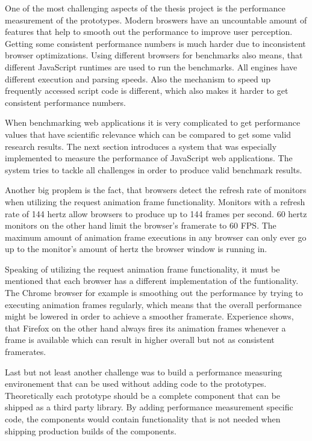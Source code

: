 One of the most challenging aspects of the thesis project is the performance measurement of the prototypes. Modern broswers have an uncountable amount of features that help to smooth out the performance to improve user perception. Getting some consistent performance numbers is much harder due to inconsistent browser optimizations. Using different browsers for benchmarks also means, that different JavaScript runtimes are used to run the benchmarks. All engines have different execution and parsing speeds. Also the mechanism to speed up frequently accessed script code is different, which also makes it harder to get consistent performance numbers.

When benchmarking web applications it is very complicated to get performance values that have scientific relevance which can be compared to get some valid research results. The next section introduces a system that was especially implemented to measure the performance of JavaScript web applications. The system tries to tackle all challenges in order to produce valid benchmark results.

Another big proplem is the fact, that browsers detect the refresh rate of monitors when utilizing the request animation frame functionality. Monitors with a refresh rate of 144 hertz allow browsers to produce up to 144 frames per second. 60 hertz monitors on the other hand limit the browser's framerate to 60 FPS. The maximum amount of animation frame executions in any browser can only ever go up to the monitor's amount of hertz the browser window is running in. 

Speaking of utilizing the request animation frame functionality, it must be mentioned that each browser has a different implementation of the funtionality. The Chrome browser for example is smoothing out the performance by trying to executing animation frames regularly, which means that the overall performance might be lowered in order to achieve a smoother framerate. Experience shows, that Firefox on the other hand always fires its animation frames whenever a frame is available which can result in higher overall but not as consistent framerates.

Last but not least another challenge was to build a performance measuring environement that can be used without adding code to the prototypes. Theoretically each prototype should be a complete component that can be shipped as a third party library. By adding performance measurement specific code, the components would contain functionality that is not needed when shipping production builds of the components.

